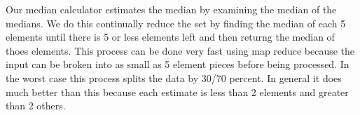\documentclass[11pt]{article}
\begin{document}
Our median calculator estimates the median by examining the median of the medians.  We do this continually reduce the set by finding the median of each 5 elements until there is 5 or less elements left and then returng the median of thoes elements.  This process can be done very fast using map reduce because the input can be broken into as small as 5 element pieces before being processed.  In the worst case this process splits the data by 30/70 percent.  In general it does much better than this because each estimate is less than 2 elements and greater than 2 others.  
\end{document}
